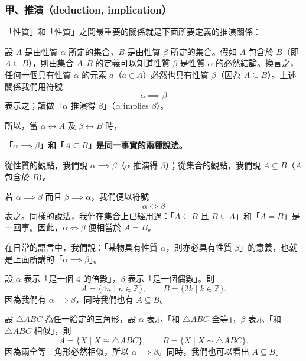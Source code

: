 \subsubsection*{甲、推演（deduction, implication）}\label{subsec:2-4-a}

「性質」和「性質」之間最重要的關係就是下面所要定義的推演關係：

設 $A$ 是由性質 $\alpha$ 所定的集合，$B$ 是由性質 $\beta$ 所定的集合。假如 $A$ 包含於 $B$（即 $A \subseteq B$），則由集合 $A, B$ 的定義可以知道性質 $\beta$ 是性質 $\alpha$ 的必然結論。換言之，任何一個具有性質 $\alpha$ 的元素 $a$（$a \in A$）必然也具有性質 $\beta$（因為 $A \subseteq B$）。上述關係我們用符號
\begin{equation}\label{eq:implication_def}
  \alpha \implies \beta
\end{equation}
表示之；讀做「$\alpha$ 推演得 $\beta$」（$\alpha$ implies $\beta$）。

所以，當 $\alpha \longleftrightarrow A$ 及 $\beta \longleftrightarrow B$ 時，
\begin{center}
  \textbf{「$\alpha \implies \beta$」和「$A \subseteq B$」是同一事實的兩種說法。}
\end{center}
從性質的觀點，我們說 $\alpha \implies \beta$（$\alpha$ 推演得 $\beta$）；從集合的觀點，我們說 $A \subseteq B$（$A$ 包含於 $B$）。

若 $\alpha \implies \beta$ 而且 $\beta \implies \alpha$，我們便以符號
\begin{equation}\label{eq:iff_def}
  \alpha \iff \beta
\end{equation}
表之。同樣的說法，我們在集合上已經用過：「$A \subseteq B$ 且 $B \subseteq A$」和「$A = B$」是一回事。因此，$\alpha \iff \beta$ 便相當於 $A = B$。

在日常的語言中，我們說：「某物具有性質 $\alpha$，則亦必具有性質 $\beta$」的意義，也就是上面所講的「$\alpha \implies \beta$」。

\begin{example}\label{ex:2-4-1}
設 $\alpha$ 表示「是一個 $4$ 的倍數」，$\beta$ 表示「是一個偶數」。則
\begin{equation*}
  A = \{4n \mid n \in \mathbb{Z}\}, \qquad B = \{2k \mid k \in \mathbb{Z}\}.
\end{equation*}
因為我們有 $\alpha \implies \beta$，同時我們也有 $A \subseteq B$。
\end{example}

\begin{example}\label{ex:2-4-2}
設 $\triangle ABC$ 為任一給定的三角形，設 $\alpha$ 表示「和 $\triangle ABC$ 全等」，$\beta$ 表示「和 $\triangle ABC$ 相似」，則
\begin{equation*}
  A = \{X \mid X \cong \triangle ABC\}, \qquad B = \{X \mid X \sim \triangle ABC\}.
\end{equation*}
因為兩全等三角形必然相似，所以 $\alpha \implies \beta$。同時，我們也可以看出 $A \subseteq B$。
\end{example}

